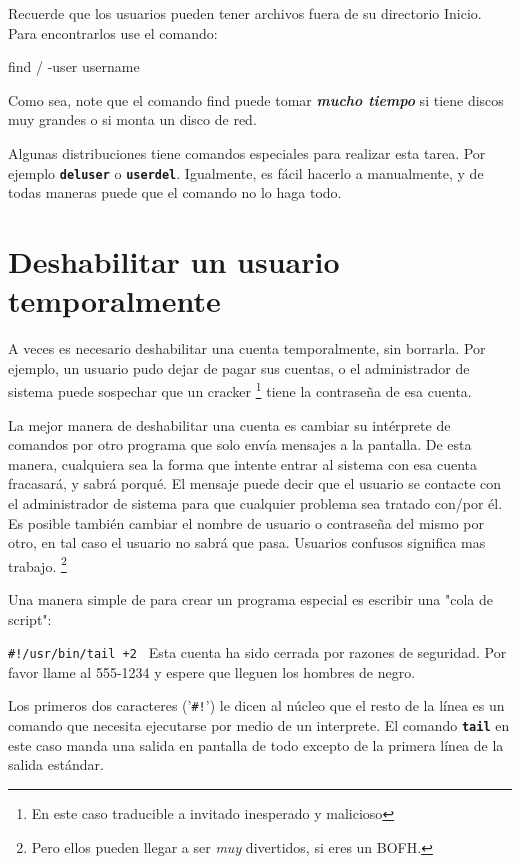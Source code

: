 Recuerde que los usuarios pueden tener archivos fuera de su directorio
Inicio.  Para encontrarlos use el comando:

 find / -user username 

Como sea, note que el comando find puede tomar \textit{\bf mucho tiempo} si
tiene discos muy grandes o si monta un disco de red.


Algunas distribuciones tiene comandos especiales para realizar esta tarea. Por 
ejemplo
\texttt{\textbf{deluser}} o \texttt{\textbf{userdel}}. Igualmente, es fácil
hacerlo a manualmente, y de todas maneras puede que el comando no lo haga todo.






\section{ Deshabilitar un usuario temporalmente}

A veces es necesario deshabilitar una cuenta temporalmente, sin borrarla.
Por ejemplo, un usuario pudo dejar de pagar sus cuentas, o el administrador de
sistema puede sospechar que un cracker
	\footnote{En este caso traducible a invitado inesperado y
	malicioso} tiene la contraseña de esa
cuenta.

La mejor manera de deshabilitar una cuenta es cambiar su intérprete de
comandos por otro programa que solo envía mensajes a la pantalla. De esta manera,
cualquiera sea la forma que intente entrar al sistema con esa cuenta fracasará,
y sabrá porqué. El mensaje puede decir que el usuario se contacte con el
administrador de sistema para que cualquier problema sea tratado con/por
él. Es posible también cambiar el nombre de usuario o contraseña
del mismo por otro, en tal caso el usuario no sabrá que pasa. Usuarios confusos
significa mas trabajo.  \footnote{Pero ellos pueden llegar a ser
\textit{muy} divertidos, si eres un BOFH.}

	
	

 Una manera simple de para crear un programa especial es escribir una
"cola de script": 

 
\texttt{\#!/usr/bin/tail +2 }
Esta cuenta ha sido cerrada por razones de seguridad.
Por favor llame al 555-1234 y espere que lleguen los hombres de negro.



Los primeros dos caracteres ('\texttt{\#!}') le dicen al núcleo que el
resto de la línea es un comando que necesita ejecutarse por medio de un
interprete. El comando \texttt{\textbf{tail}} en este caso manda una salida en
pantalla de todo excepto de la primera línea de la salida estándar.

